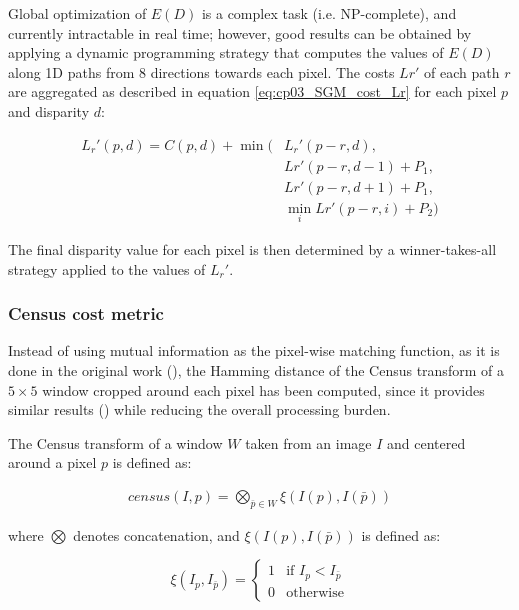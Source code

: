 Global optimization of $E(D)$ is a complex task (i.e. NP-complete), and currently intractable in real time; however, good results can be obtained by applying a dynamic programming strategy that computes the values of $E(D)$ along 1D paths from 8 directions towards each pixel. The costs $Lr'$ of each path $r$ are aggregated as described in equation \ref{eq:cp03_SGM_cost_Lr} for each pixel $p$ and disparity $d$:

\begin{align}\label{eq:cp03_SGM_cost_Lr}
L_r'(p,d) = C(p,d) + \min( & L_r'(p-r,d), \nonumber \\
	    & Lr'(p-r, d-1) + P_1, \nonumber \\
	    & Lr'(p-r,d+1)+P_1, \nonumber \\
	    & \min_i Lr'(p-r, i) + P_2)
\end{align}

The final disparity value for each pixel is then determined by a winner-takes-all strategy applied to the values of $L_r'$.

\subsubsection{Census cost metric}\label{ch:chapter03_03_01_01}

Instead of using mutual information as the pixel-wise matching function, as it is done in the original work (\cite{Hirschmuller2005}), the Hamming distance of the Census transform of a $5 \times 5$ window cropped around each pixel has been computed, since it provides similar results (\cite{Hirschmuller2009}) while reducing the overall processing burden.

The Census transform of a window $W$ taken from an image $I$ and centered around a pixel $p$ is defined as:

\begin{align}\label{eq:cp03_census_transform}
census(I, p) = \underset{\bar{p} \in W}{\bigotimes} \xi(I(p), I(\bar{p}))
\end{align}

where $\bigotimes$ denotes concatenation, and $\xi(I(p), I(\bar{p}))$ is defined as:

\begin{equation}\label{eq:cp03_census_xi}
\xi(I_p, I_{\bar{p}}) = \left\{ \begin{array}{ll}
         1 & \text{if~} I_p < I_{\bar{p}}\\
         0 & \text{otherwise}
         \end{array} \right.
\end{equation}

